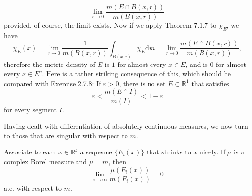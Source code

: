 $$
\lim_{r\rightarrow 0} \frac{m\left( E\cap B\left( x,r \right) \right)}{m\left( B\left( x,r \right) \right)}
$$
provided, of course, the limit exists. Now if we apply Theorem 7.1.7 to $\chi_E$, we have 
$$
\chi _E\left( x \right) =\lim_{r\rightarrow 0} \frac{1}{m\left( B\left( x,r \right) \right)}\int_{B\left( x,r \right)}{\chi _E\mathrm{d}m}=\lim_{r\rightarrow 0} \frac{m\left( E\cap B\left( x,r \right) \right)}{m\left( B\left( x,r \right) \right)},
$$
therefore the metric density of $E$ is $1$ for almost every $x\in E$, and is $0$ for almost every $x\in E^c$. Here is a rather striking consequence of this, which should be compared with Exercise 2.7.8: If $\varepsilon>0$, there is no set $E\subset\mathbb{R}^1$ that satisfies 
$$
\varepsilon <\frac{m\left( E\cap I \right)}{m\left( I \right)}<1-\varepsilon 
$$
for every segment $I$.\par
Having dealt with differentiation of absolutely continuous measures, we now turn to those that are singular with respect to $m$.
\begin{theorem}
Associate to each $x\in\mathbb{R}^k$ a sequence $\{E_i(x)\}$ that shrinks to $x$ nicely. If $\mu$ is a complex Borel measure and $\mu\perp m$, then 
$$
\lim_{i\rightarrow \infty} \frac{\mu \left( E_i\left( x \right) \right)}{m\left( E_i\left( x \right) \right)}=0
$$
a.e. with respect to $m$.
\end{theorem}
